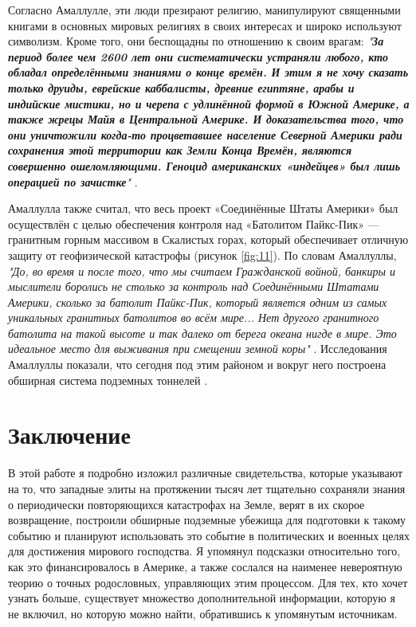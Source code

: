 \documentclass[10pt,twocolumn,letterpaper]{article}
\begin{document}
Согласно Амаллулле, эти люди презирают религию, манипулируют священными книгами в основных мировых религиях в своих интересах и широко используют символизм. Кроме того, они беспощадны по отношению к своим врагам: \textit{"\textbf{За период более чем 2600 лет они систематически устраняли любого, кто обладал определёнными знаниями о конце времён. И этим я не хочу сказать только друиды, еврейские каббалисты, древние египтяне, арабы и индийские мистики, но и черепа с удлинённой формой в Южной Америке, а также жрецы Майя в Центральной Америке. И доказательства того, что они уничтожили когда-то процветавшее население Северной Америки ради сохранения этой территории как Земли Конца Времён, являются совершенно ошеломляющими. Геноцид американских «индейцев» был лишь операцией по зачистке}"} \cite{33,34}.

Амаллулла также считал, что весь проект «Соединённые Штаты Америки» был осуществлён с целью обеспечения контроля над «Батолитом Пайкс-Пик» — гранитным горным массивом в Скалистых горах, который обеспечивает отличную защиту от геофизической катастрофы (рисунок \ref{fig:11}). По словам Амаллуллы, \textit{"До, во время и после того, что мы считаем Гражданской войной, банкиры и мыслители боролись не столько за контроль над Соединёнными Штатами Америки, сколько за батолит Пайкс-Пик, который является одним из самых уникальных гранитных батолитов во всём мире... Нет другого гранитного батолита на такой высоте и так далеко от берега океана нигде в мире. Это идеальное место для выживания при смещении земной коры"} \cite{33,34}. Исследования Амаллуллы показали, что сегодня под этим районом и вокруг него построена обширная система подземных тоннелей \cite{36}.
\section{Заключение}

В этой работе я подробно изложил различные свидетельства, которые указывают на то, что западные элиты на протяжении тысяч лет тщательно сохраняли знания о периодически повторяющихся катастрофах на Земле, верят в их скорое возвращение, построили обширные подземные убежища для подготовки к такому событию и планируют использовать это событие в политических и военных целях для достижения мирового господства. Я упомянул подсказки относительно того, как это финансировалось в Америке, а также сослался на наименее невероятную теорию о точных родословных, управляющих этим процессом. Для тех, кто хочет узнать больше, существует множество дополнительной информации, которую я не включил, но которую можно найти, обратившись к упомянутым источникам.
\end{document}
